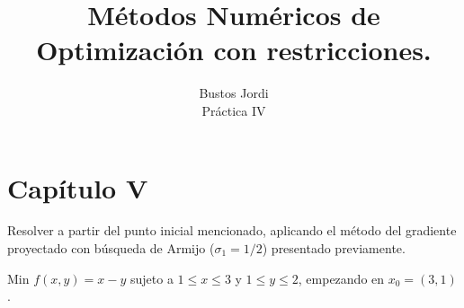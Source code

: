 \documentclass{article}
\newenvironment{theorem}[2][Ejercicio]{\begin{trivlist}
\item[\hskip \labelsep {\bfseries #1}\hskip \labelsep {\bfseries #2.}]}{\end{trivlist}}
\begin{document}
\title{Métodos Numéricos de Optimización con restricciones.}
\author{Bustos Jordi\\Práctica IV}

\maketitle

\section*{Capítulo V}
\begin{theorem}{1}
    Resolver a partir del punto inicial mencionado, aplicando el método del gradiente proyectado con búsqueda de Armijo (\(\sigma_1 = 1/2\)) presentado previamente.

    Min \(f(x,y) = x - y\) sujeto a \(1 \leq x \leq 3\) y \( 1 \leq y \leq 2\), empezando en \(x_0 = (3,1)\).
\end{theorem}
\end{document}
